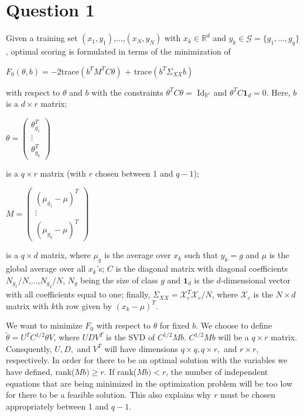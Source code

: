 \section*{Question 1}
Given a training set $(x_{1}, y_{1})$,...,$(x_{N}, y_{N})$ with $x_{k} \in \mathbb{R}^{d}$ and $y_{k} \in \mathcal{G} = \{g_{1},...,g_{q}\}$, optimal scoring is formulated in terms of the minimization of
\begin{center}
    $F_{0}(\theta, b) = -2$trace$(b^{T}M^{T}C\theta)$ + trace$(b^{T}\Sigma_{XX}b)$
\end{center}
with respect to $\theta$ and $b$ with the constraints $\theta^{T}C\theta =$ Id$_{\mathbb{R}^{r}}$ and $\theta^{T}C\textbf{1}_{d} = 0$. Here, $b$ is a $d \times r$ matrix;
\begin{center}
    $\theta =
    \begin{pmatrix}
    \theta_{g_{1}}^{T}\\
    \vdots \\
    \theta_{g_{q}}^{T}
    \end{pmatrix}$
\end{center}
is a $q \times r$ matrix (with $r$ chosen between 1 and $q - 1$);
\begin{center}
    $M =
    \begin{pmatrix}
    (\mu_{g_{1}} - \mu)^{T}\\
    \vdots \\
    (\mu_{g_{q}} - \mu)^{T}
    \end{pmatrix}$
\end{center}
is a $q \times d$ matrix, where $\mu_{g}$ is the average over $x_{k}$ such that $y_{k} = g$ and $\mu$ is the global average over all $x_{k}$'s; $C$ is the diagonal matrix with diagonal coefficients $N_{g_{1}}/N$,...,$N_{g_{q}}/N$, $N_{g}$ being the size of class $g$ and $\textbf{1}_{d}$ is the $d$-dimensional vector with all coefficients equal to one; finally, $\Sigma_{XX} = \mathcal{X}_{c}^{T}\mathcal{X}_{c}/N$, where $\mathcal{X}_{c}$ is the $N \times d$ matrix with $k$th row given by $(x_{k} - \mu)^{T}$.

We want to minimize $F_{0}$ with respect to $\theta$ for fixed $b$. We choose to define $\tilde{\theta} = U^{T}C^{1/2}\theta V$, where $UDV^{T}$ is the SVD of $C^{1/2}Mb$. $C^{1/2}Mb$ will be a $q \times r$ matrix. Consquently, $U, D,$ and $V^{T}$ will have dimensions $q \times q, q \times r,$ and $r \times r$, respectively. In order for there to be an optimal solution with the variables we have defined, rank($Mb) \geq r$. If rank($Mb) < r$, the number of independent equations that are being minimized in the optimization problem will be too low for there to be a feasible solution. This also explains why $r$ must be chosen appropriately between 1 and $q - 1$.

